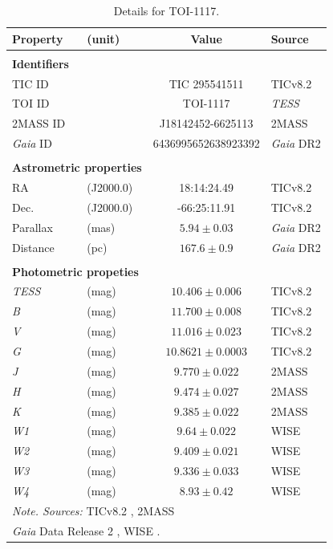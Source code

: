 \documentclass[fleqn,usenatbib,useAMS]{mnras}
\begin{document}
\begin{table}
    \caption{Details for TOI-1117.}
    \label{table 1}
    \begin{tabular}{llcl}
        \hline
        Property & (unit) & Value & Source\\
        \hline
        \\\multicolumn{2}{l}{\textbf{Identifiers}} \\
        TIC ID & & TIC 295541511 & TICv8.2\\
        TOI ID & & TOI-1117 & \textit{TESS}\\
        2MASS ID & & J18142452-6625113 & 2MASS\\
        \textit{Gaia} ID & & 6436995652638923392 & \textit{Gaia} DR2\\
        \\\multicolumn{2}{l}{\textbf{Astrometric properties}} \\
        RA & (J2000.0) & 18:14:24.49 & TICv8.2\\
        Dec. & (J2000.0) & -66:25:11.91 & TICv8.2\\
        Parallax & (mas) & $5.94\pm0.03$ & \textit{Gaia} DR2\\
        Distance & (pc) & $167.6\pm0.9$ & \textit{Gaia} DR2\\
        \\\multicolumn{2}{l}{\textbf{Photometric propeties}} \\
        \textit{TESS} & (mag) & $10.406\pm0.006$ & TICv8.2\\
        \it B & (mag) & $11.700\pm0.008$& TICv8.2\\
        \it V & (mag) & $11.016\pm0.023$& TICv8.2\\
        \it G & (mag) & $10.8621\pm0.0003$& TICv8.2\\
        \it J & (mag) & $9.770\pm0.022$& 2MASS\\
        \it H & (mag) & $9.474\pm0.027$& 2MASS\\
        \it K & (mag) & $9.385\pm0.022$& 2MASS\\
        \it W1 & (mag) & $9.64\pm0.022$& WISE\\
        \it W2 & (mag) & $9.409\pm0.021$& WISE\\
        \it W3 & (mag) & $9.336\pm0.033$& WISE\\
        \it W4 & (mag) & $8.93\pm0.42$& WISE\\
        \hline
        \multicolumn{4}{l}{\textit{Note. Sources:} TICv8.2 \citep{paegert2021}, 2MASS \citep{Skrutskie_2006}}\\
        \multicolumn{4}{l}{\textit{Gaia} Data Release 2 \citep{GAIA}, WISE \citep{Wright_2010}.}
    \end{tabular}
\end{table}
\end{document}
